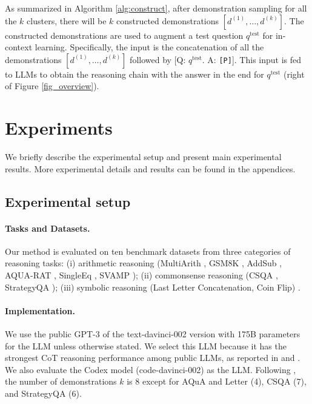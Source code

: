 As summarized in Algorithm \ref{alg:construct}, after demonstration sampling for all the $k$ clusters, there will be $k$ constructed demonstrations $[d^{(1)}, \ldots, d^{(k)}]$.
The constructed demonstrations are used to augment a test question $q^{\text{test}}$ for in-context learning. Specifically, the input is the concatenation of all the demonstrations $[d^{(1)}, \ldots, d^{(k)}]$ followed by [Q: $q^{\text{test}}$. A: \texttt{[P]}].
This input is fed to LLMs to obtain the reasoning chain with the answer in the end for $q^{\text{test}}$ (right of Figure \ref{fig_overview}).

\section{Experiments}

We briefly describe the experimental setup and present main experimental results.
More experimental details and results can be found in the appendices.

\subsection{Experimental setup}
\paragraph{Tasks and Datasets.} Our method is evaluated on ten benchmark datasets from three categories of reasoning tasks: (i) arithmetic reasoning (MultiArith \citep{multiarith}, GSM8K \citep{gsm8k}, AddSub \citep{addsub}, AQUA-RAT \citep{aqua}, SingleEq \citep{koncel2015parsing}, SVAMP \citep{svamp}); (ii) commonsense reasoning (CSQA \citep{commonsenseqa}, StrategyQA \citep{strategyqa}); (iii) symbolic reasoning (Last Letter Concatenation, Coin Flip) \citep{cot_wei}.

\paragraph{Implementation.} We use the public  GPT-3 \citep{brown2020language} of the text-davinci-002 version
with 175B parameters for the LLM  \citep{instructgpt} unless otherwise stated. We select this LLM because it has the strongest CoT reasoning performance among public LLMs, as reported in \citet{kojima2022large} and \citet{cot_wei}.
We also evaluate the Codex model \citep{chen2021evaluating} (code-davinci-002) as the LLM.
Following \citet{cot_wei}, the number of demonstrations $k$ is 8  except for AQuA and Letter (4), CSQA (7), and StrategyQA (6).

